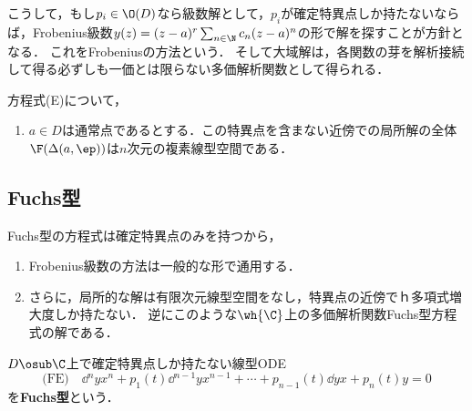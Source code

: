 \documentclass[uplatex,dvipdfmx]{jsreport}
\begin{document}
\begin{remarks}
    こうして，もし$p_i\in\O(D)$なら級数解として，$p_i$が確定特異点しか持たないならば，Frobenius級数$y(z)=(z-a)^r\sum_{n\in\N}c_n(z-a)^n$の形で解を探すことが方針となる．
    これをFrobeniusの方法という．
    そして大域解は，各関数の芽を解析接続して得る必ずしも一価とは限らない多価解析関数として得られる．
\end{remarks}

\begin{theorem}
    方程式(E)について，
    \begin{enumerate}
        \item $a\in D$は通常点であるとする．この特異点を含まない近傍での局所解の全体$\F(\Delta(a,\ep))$は$n$次元の複素線型空間である．
    \end{enumerate}
\end{theorem}

\subsection{Fuchs型}

\begin{tcolorbox}[colframe=ForestGreen, colback=ForestGreen!10!white,breakable,colbacktitle=ForestGreen!40!white,coltitle=black,fonttitle=\bfseries\sffamily,
title=]
    Fuchs型の方程式は確定特異点のみを持つから，
    \begin{enumerate}
        \item Frobenius級数の方法は一般的な形で通用する．
        \item さらに，局所的な解は有限次元線型空間をなし，特異点の近傍でｈ多項式増大度しか持たない．
        逆にこのような$\wh{\C}$上の多価解析関数Fuchs型方程式の解である．
    \end{enumerate}
\end{tcolorbox}

\begin{problem}
    $D\osub\C$上で確定特異点しか持たない線型ODE
    \[\text{(FE)}\quad \dd{^ny}{x^n}+p_1(t)\dd{^{n-1}y}{x^{n-1}}+\cdots+p_{n-1}(t)\dd{y}{x}+p_n(t)y=0\]
    を\textbf{Fuchs型}という．
\end{problem}
\end{document}

